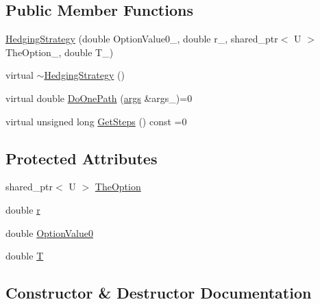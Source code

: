 \subsection*{Public Member Functions}
\begin{DoxyCompactItemize}
\item 
\hyperlink{classHedgingStrategy_a7b25f86f2901f200a27c73f812aef4d3}{Hedging\+Strategy} (double Option\+Value0\+\_\+, double r\+\_\+, shared\+\_\+ptr$<$ U $>$ The\+Option\+\_\+, double T\+\_\+)
\item 
virtual \hyperlink{classHedgingStrategy_a799ea631e5b22c0c3579495596aec59c}{$\sim$\+Hedging\+Strategy} ()
\item 
virtual double \hyperlink{classHedgingStrategy_ad2a7c02ee59750c40f29a03ee6fee140}{Do\+One\+Path} (\hyperlink{path__generation_8h_a75c13cde2074f502cc4348c70528572d}{args} \&args\+\_\+)=0
\item 
virtual unsigned long \hyperlink{classHedgingStrategy_a4df1155158f019fb0c4f565045b9e633}{Get\+Steps} () const =0
\end{DoxyCompactItemize}
\subsection*{Protected Attributes}
\begin{DoxyCompactItemize}
\item 
shared\+\_\+ptr$<$ U $>$ \hyperlink{classHedgingStrategy_a65699a183423af9d947bb939ae8e907d}{The\+Option}
\item 
double \hyperlink{classHedgingStrategy_a313da7bc1911dba2a166d2c7bed5f1d7}{r}
\item 
double \hyperlink{classHedgingStrategy_ac96528e9f4e5a0d1e5aadcc2ebdcab55}{Option\+Value0}
\item 
double \hyperlink{classHedgingStrategy_aedb4069f0709b49482a72b9d9c906a5e}{T}
\end{DoxyCompactItemize}


\subsection{Constructor \& Destructor Documentation}
\hypertarget{classHedgingStrategy_a7b25f86f2901f200a27c73f812aef4d3}{}\label{classHedgingStrategy_a7b25f86f2901f200a27c73f812aef4d3} 
